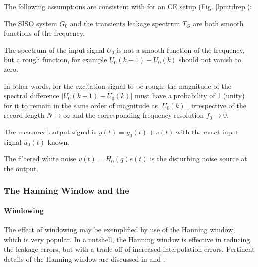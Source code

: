 The following assumptions are consistent with \citep{schoukens2010nonparametric} for an OE setup (Fig. \ref{lpmtdrep}):
\begin{assumption}
The SISO system $G_0$ and  the transients leakage spectrum $T_G$ are both smooth functions of the frequency.
\end{assumption}



\begin{assumption}

The spectrum of the  input signal $U_0$ is not a smooth function of the frequency, but a rough function, for example $U_0(k+1) - U_0(k)$ should not vanish to zero. %
\end{assumption}

In other words, for the excitation signal to be rough: the magnitude of the spectral difference $|U_0(k+1) - U_0(k)|$ must have a probability of 1 (unity) for it to remain in the same order of magnitude as $|U_0(k)|$, irrespective of the record length $N\rightarrow\infty$ and the corresponding  frequency resolution $f_0\rightarrow{0}$.


\begin{assumption}
The measured output signal is $y(t) = y_0(t) + v(t)$ with the exact input signal $u_0(t)$ known. 
\end{assumption}


\begin{assumption}
The filtered white noise $v(t) = H_0(q)e(t)$ is the disturbing noise source at the output.
\end{assumption}


\subsubsection{The Hanning Window and the }\label{se:LPMFRFest}%
\paragraph{Windowing}
The effect of windowing may be  exemplified by use of the Hanning window, which is very popular.  In a nutshell, the Hanning window is effective in reducing  the leakage errors, but  with a trade off of increased interpolation errors. %
Pertinent details of the Hanning window are discussed in \citep{Schoukens2006LPM,Antoni2007FRF,schoukens2010nonparametric,Wellstead198155} and \citep{harris1978}.

